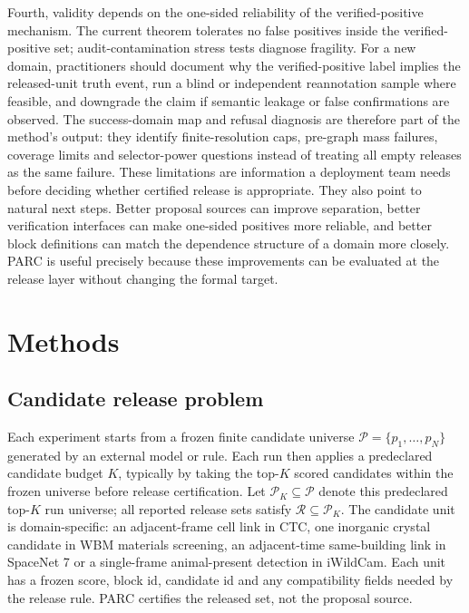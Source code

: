 \documentclass[10pt,twocolumn]{article}
\newcommand{\Pcal}{\mathcal P}
\newcommand{\Rcal}{\mathcal R}
\begin{document}
Fourth, validity depends on the one-sided reliability of the verified-positive mechanism.
The current theorem tolerates no false positives inside the verified-positive set; audit-contamination stress tests diagnose fragility.
For a new domain, practitioners should document why the verified-positive label implies the released-unit truth event, run a blind or independent reannotation sample where feasible, and downgrade the claim if semantic leakage or false confirmations are observed.
The success-domain map and refusal diagnosis are therefore part of the method's output: they identify finite-resolution caps, pre-graph mass failures, coverage limits and selector-power questions instead of treating all empty releases as the same failure.
These limitations are information a deployment team needs before deciding whether certified release is appropriate.
They also point to natural next steps.
Better proposal sources can improve separation, better verification interfaces can make one-sided positives more reliable, and better block definitions can match the dependence structure of a domain more closely.
PARC is useful precisely because these improvements can be evaluated at the release layer without changing the formal target.

\section{Methods}

\subsection{Candidate release problem}

Each experiment starts from a frozen finite candidate universe \(\Pcal=\{p_1,\ldots,p_N\}\) generated by an external model or rule.
Each run then applies a predeclared candidate budget \(K\), typically by taking the top-\(K\) scored candidates within the frozen universe before release certification.
Let \(\Pcal_K\subseteq\Pcal\) denote this predeclared top-\(K\) run universe; all reported release sets satisfy \(\Rcal\subseteq\Pcal_K\).
The candidate unit is domain-specific: an adjacent-frame cell link in CTC, one inorganic crystal candidate in WBM materials screening, an adjacent-time same-building link in SpaceNet 7 or a single-frame animal-present detection in iWildCam.
Each unit has a frozen score, block id, candidate id and any compatibility fields needed by the release rule.
PARC certifies the released set, not the proposal source.
\end{document}
